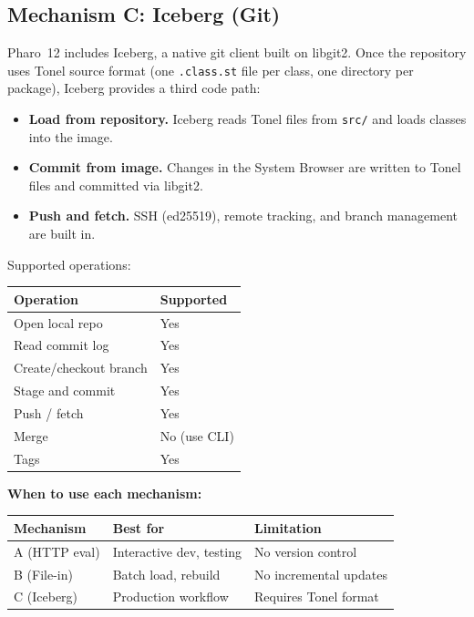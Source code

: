 \documentclass[a4paper,10pt,fleqn]{article}
\begin{document}
\subsection{Mechanism C: Iceberg (Git)}

Pharo~12 includes Iceberg, a native git client built on libgit2.  Once
the repository uses Tonel source format (one \texttt{.class.st} file per
class, one directory per package), Iceberg provides a third code path:

\begin{itemize}
  \item \textbf{Load from repository.}  Iceberg reads Tonel files from
    \texttt{src/} and loads classes into the image.
  \item \textbf{Commit from image.}  Changes in the System Browser are
    written to Tonel files and committed via libgit2.
  \item \textbf{Push and fetch.}  SSH (ed25519), remote tracking, and
    branch management are built in.
\end{itemize}

Supported operations:

\begin{center}
\begin{tabular}{@{}ll@{}}
\toprule
\textbf{Operation} & \textbf{Supported} \\
\midrule
Open local repo       & Yes \\
Read commit log       & Yes \\
Create/checkout branch & Yes \\
Stage and commit      & Yes \\
Push / fetch          & Yes \\
Merge                 & No (use CLI) \\
Tags                  & Yes \\
\bottomrule
\end{tabular}
\end{center}

\textbf{When to use each mechanism:}

\begin{center}
\begin{tabular}{@{}lll@{}}
\toprule
\textbf{Mechanism} & \textbf{Best for} & \textbf{Limitation} \\
\midrule
A (HTTP eval) & Interactive dev, testing & No version control \\
B (File-in)   & Batch load, rebuild     & No incremental updates \\
C (Iceberg)   & Production workflow     & Requires Tonel format \\
\bottomrule
\end{tabular}
\end{center}
\end{document}
